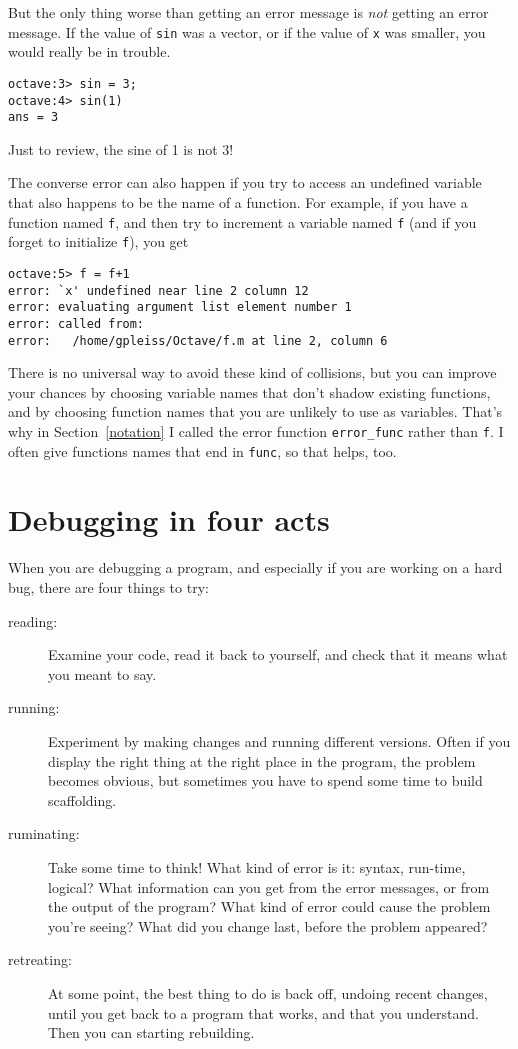 But the only thing worse than getting an error message is {\em not}
getting an error message. If the value of {\tt sin} was a vector,
or if the value of {\tt x} was smaller, you would really
be in trouble.

\begin{verbatim}
octave:3> sin = 3;
octave:4> sin(1)
ans = 3
\end{verbatim}

Just to review, the sine of 1 is not 3!

The converse error can also happen if you try to access an
undefined variable that also happens to be the name of a function.
For example, if you have a function named {\tt f}, and then
try to increment a variable named {\tt f} (and if you forget to
initialize {\tt f}), you get

\begin{verbatim}
octave:5> f = f+1
error: `x' undefined near line 2 column 12
error: evaluating argument list element number 1
error: called from:
error:   /home/gpleiss/Octave/f.m at line 2, column 6
\end{verbatim}

There is no universal way to avoid these kind of
collisions, but you can improve your chances by choosing
variable names that don't shadow existing functions, and by
choosing function names that you are unlikely to use as variables.
That's why in Section~\ref{notation} I called the error function
{\tt error\_func} rather than {\tt f}. I often give functions
names that end in {\tt func}, so that helps, too.


\section{Debugging in four acts}

When you are debugging a program, and especially if you are
working on a hard bug, there are four things to try:

\begin{description}

\item[reading:] Examine your code, read it back to yourself, and
check that it means what you meant to say.

\item[running:] Experiment by making changes and running different
versions. Often if you display the right thing at the right place
in the program, the problem becomes obvious, but sometimes you have to
spend some time to build scaffolding.

\item[ruminating:] Take some time to think! What kind of error
is it: syntax, run-time, logical? What information can you get from
the error messages, or from the output of the program? What kind of
error could cause the problem you're seeing? What did you change
last, before the problem appeared?

\item[retreating:] At some point, the best thing to do is back
off, undoing recent changes, until you get back to a program that
works, and that you understand. Then you can starting rebuilding.

\end{description}

